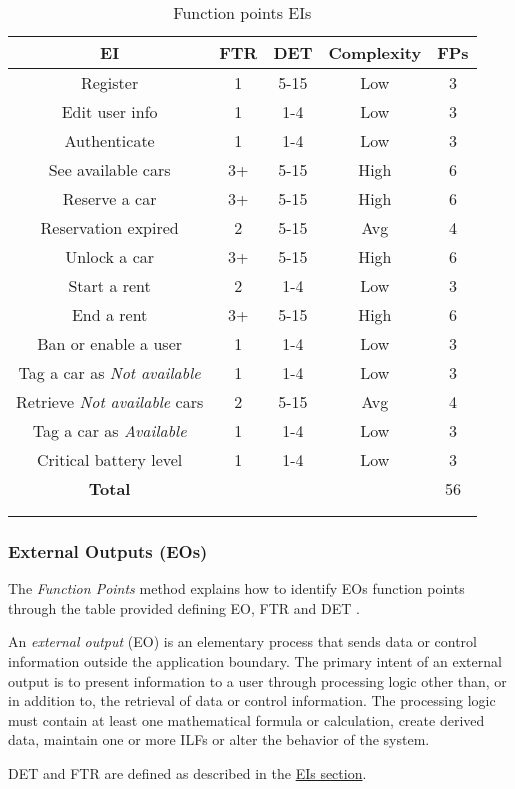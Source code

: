 \begin{longtable}{ccccc}
\toprule
\textbf{EI}	& FTR & DET & 	Complexity  & \textbf{FPs}\\
\midrule
Register & 1 & 5-15 &	Low & 3 \\
\midrule
Edit user info & 1 & 1-4 &	Low & 3 \\
Authenticate &1 & 1-4 & Low & 3 \\
See available cars & 3+ & 5-15 & High & 6 \\
Reserve a car & 3+ & 5-15 & High & 6 \\
Reservation expired & 2 & 5-15 & Avg & 4 \\
Unlock a car & 3+ & 5-15 & High & 6 \\
Start a rent & 2 & 1-4 &	Low & 3 \\
End a rent & 3+ & 5-15 & High & 6 \\
\midrule
Ban or enable a user & 1 & 1-4 &	Low & 3 \\
Tag a car as \emph{Not available} & 1 & 1-4 &	Low & 3 \\
\midrule
Retrieve \emph{Not available} cars & 2 & 5-15 & Avg & 4\\
Tag a car as \emph{Available} & 1 & 1-4 &	Low & 3\\
\midrule
Critical battery level & 1 & 1-4 &	Low & 3\\
\midrule
\textbf{Total} & & & &  56\\
\bottomrule \\
\caption{Function points EIs}
\label{tbl:eiFP}
\end{longtable}


\subsubsection{External Outputs (EOs)} 

The \emph{Function Points} method explains how to identify EOs function points through the table provided defining EO, FTR and DET \cite{FP}.

An \textit{external output} (EO) is an elementary process that sends data or control information outside the application boundary. The primary intent of an external output is to present information to a user through processing logic other than, or in addition to, the retrieval of data or control information. The processing logic must contain at least one mathematical formula or calculation, create derived data, maintain one or more ILFs or alter the behavior of the system.

DET and FTR are defined as described in the \hyperref[sec:EIs]{EIs section}.\\

